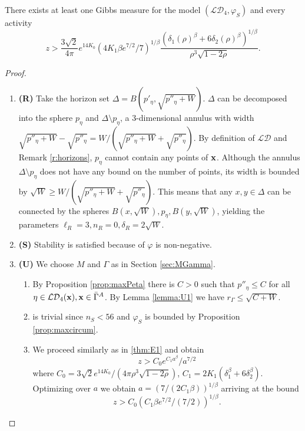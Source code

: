 \begin{theorem}\label{thm:E3}
	There exists at least one Gibbs measure for the model $(\mathcal {LD}_4,\varphi_S)$ and every activity 
	$$z> \frac{3\sqrt 2}{4\pi}e^{14 K_0}   (4K_1 \beta e^{7/2}/7)^{1/\beta} \frac{(\delta_1(\rho)^\beta + 6\delta_2(\rho)^\beta)^{1/\beta}}{\rho^3 \sqrt{1-2\rho}}.$$
\end{theorem}
\begin{proof}
\begin{enumerate}[]
	\item \textbf{(R)} Take the horizon set $\Delta = B(p'_\eta, \sqrt{p''_\eta + W})$. $\Delta$ can be decomposed into the sphere $p_\eta$ and $\Delta \setminus p_\eta$, a 3-dimensional annulus with width $\sqrt{p''_\eta+W} -\sqrt{p''_\eta}=W/(\sqrt{p''_\eta+W} + \sqrt{p''_\eta})$. By definition of $\mathcal {LD}$ and Remark \ref{r:horizons}, $p_\eta$  cannot contain any points of ${\mathbf{x}}$.  Although the annulus $\Delta \setminus p_\eta$ does not have any bound on the number of points, its width is bounded by $\sqrt W \geq  W/(\sqrt{p''_\eta+W} + \sqrt{p''_\eta})$. This means that any $x,y\in \Delta$ can be connected by the spheres $B(x,\sqrt W), p_\eta, B(y,\sqrt W)$, yielding the parameters $\ell_R = 3,n_R=0,\delta_R=2\sqrt W$.
	\item \textbf{(S)} Stability is satisfied because of $\varphi$ is non-negative.
	\item \textbf{(U)} We choose $M$ and $\Gamma$ as in Section \ref{sec:MGamma}.
		\begin{enumerate}[(U1)]
			\item By Proposition \ref{prop:maxPeta} there is $C>0$ such that $p''_\eta\leq C$ for all $\eta \in \mathcal {LD}_4({\mathbf{x}}), {\mathbf{x}} \in \bar\Gamma^A$. By Lemma \ref{lemma:U1} we have $r_\Gamma\leq \sqrt{C + W}$.
			\item is trivial since $n_S<56$ and $\varphi_{S}$ is bounded by Proposition \ref{prop:maxcircum}.
			\item We proceed similarly as in \ref{thm:E1} and obtain
				$$z>C_0 e^{C_1 a^\beta} / a^{7/2}$$
				where $C_0=3 \sqrt 2 e^{14K_0} / (4\pi \rho^3 \sqrt{1-2\rho})$, $C_1 = 2K_1(\delta_1^\beta + 6\delta_2^\beta)$. Optimizing over $a$ we obtain $a=(7/(2C_1\beta))^{1/\beta}$ arriving at the bound
				$$z> C_0 (C_1 \beta e^{7/2} / (7/2))^{1/\beta}.$$
		\end{enumerate}
\end{enumerate}
\end{proof}




